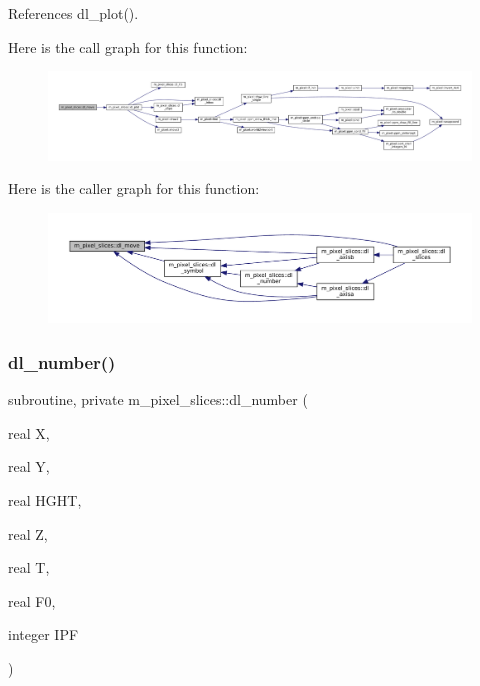 References dl\+\_\+plot().

Here is the call graph for this function\+:\nopagebreak
\begin{figure}[H]
\begin{center}
\leavevmode
\includegraphics[width=350pt]{namespacem__pixel__slices_ab9e9530d7fb4fbea1bc5d52744498731_cgraph}
\end{center}
\end{figure}
Here is the caller graph for this function\+:\nopagebreak
\begin{figure}[H]
\begin{center}
\leavevmode
\includegraphics[width=350pt]{namespacem__pixel__slices_ab9e9530d7fb4fbea1bc5d52744498731_icgraph}
\end{center}
\end{figure}
\mbox{\label{namespacem__pixel__slices_a7d9372496e88c384aea5ad1b26750d1b}} 
\subsubsection{\texorpdfstring{dl\+\_\+number()}{dl\_number()}}
{\footnotesize\ttfamily subroutine, private m\+\_\+pixel\+\_\+slices\+::dl\+\_\+number (\begin{DoxyParamCaption}\item[{real}]{X,  }\item[{real}]{Y,  }\item[{real}]{H\+G\+HT,  }\item[{real}]{Z,  }\item[{real}]{T,  }\item[{real}]{F0,  }\item[{integer}]{I\+PF }\end{DoxyParamCaption})\hspace{0.3cm}{\ttfamily [private]}}



